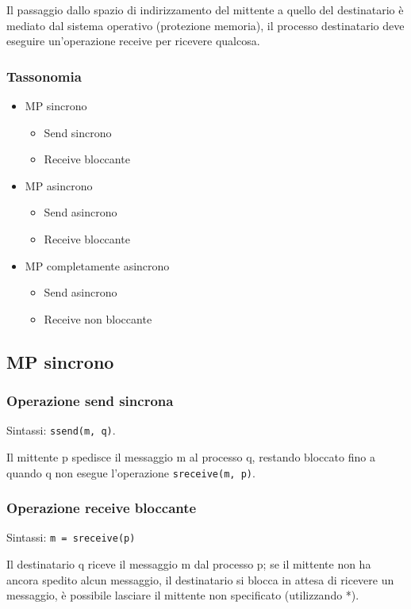 Il passaggio dallo spazio di indirizzamento del mittente a quello del destinatario è mediato dal sistema operativo (protezione memoria), il processo destinatario deve eseguire un'operazione receive per ricevere qualcosa.

\subsubsection{Tassonomia}
\begin{itemize}
    \item MP sincrono \begin{itemize}
        \item Send sincrono
        \item Receive bloccante
    \end{itemize}
    \item MP asincrono \begin{itemize}
        \item Send asincrono
        \item Receive bloccante
        \end{itemize}
    \item MP completamente asincrono \begin{itemize}
        \item Send asincrono
        \item Receive non bloccante
        \end{itemize}
\end{itemize}

\subsection{MP sincrono}
\subsubsection{Operazione send sincrona}
Sintassi: \lstinline{ssend(m, q)}.

Il mittente p spedisce il messaggio m al processo q, restando bloccato fino a quando q non esegue l'operazione \lstinline{sreceive(m, p)}.

\subsubsection{Operazione receive bloccante}
Sintassi: \lstinline{m = sreceive(p)}

Il destinatario q riceve il messaggio m dal processo p; se il mittente non ha ancora spedito alcun messaggio, il destinatario si blocca in attesa di ricevere un messaggio, è possibile lasciare il mittente non specificato (utilizzando *).


